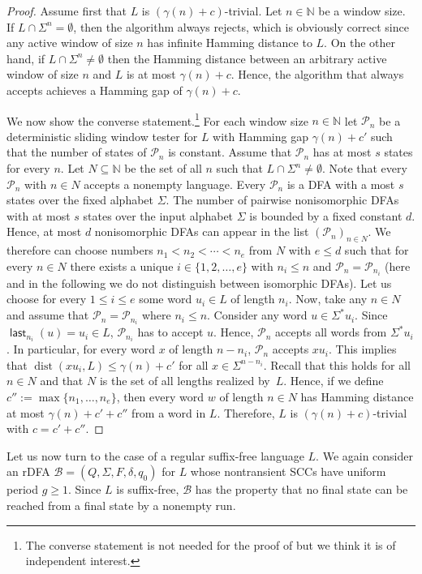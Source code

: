 \documentclass{theoretics}
\newcommand{\N}{\mathbb{N}}
\newcommand{\B}{\mathcal{B}}
\renewcommand{\P}{\mathcal{P}}
\DeclareMathOperator{\last}{\mathsf{last}}
\DeclareMathOperator{\dist}{dist}
\renewcommand{\geq}{\geqslant}
\renewcommand{\leq}{\leqslant}
\renewcommand{\ge}{\geq}
\renewcommand{\le}{\leq}
\begin{document}
\begin{proof}
Assume first that $L$ is $(\gamma(n)+c)$-trivial. Let $n \in \N$ be a window size.
If $L\cap \Sigma^n=\emptyset$, then the algorithm always rejects,
which is obviously correct since any active window of size $n$ has infinite Hamming distance to $L$. 
On the other hand, if $L\cap \Sigma^n \neq \emptyset$ then the Hamming distance between an arbitrary active window
of size $n$ and $L$ is at most $\gamma(n)+c$. Hence, the algorithm that always accepts achieves
a Hamming gap of $\gamma(n)+c$.

We now show the converse statement.\footnote{The converse statement is not needed for the proof of  
but we think it is of independent interest.}
For each window size $n \in \N$ let $\P_n$ be a deterministic sliding window tester for $L$
with Hamming gap $\gamma(n)+c'$ such that the number of states of $\P_n$ is constant.
Assume that $\P_n$ has at most $s$ states for every $n$.
Let $N \subseteq \N$ be the set of all $n$ such that $L \cap \Sigma^n \neq \emptyset$.
Note that every $\P_n$ with $n \in N$ accepts a nonempty language.
Every $\P_n$ is a DFA with a most $s$ states over the fixed alphabet $\Sigma$.
The number of pairwise nonisomorphic DFAs with at most $s$ states
over the input alphabet $\Sigma$ is bounded by a fixed constant $d$.
Hence, at most $d$ nonisomorphic DFAs can appear in the list $(\P_n)_{n \in N}$.
We therefore can choose 
numbers $n_1 < n_2 < \cdots < n_e$ from $N$ with $e \leq d$ such that
for every $n \in N$ there exists a unique $i \in \{1,2,\ldots,e\}$ with $n _i \le n$ and $\P_n = \P_{n_i}$
(here and in the following we do not distinguish between isomorphic DFAs).
Let us choose for every $1 \le i \le e$ some word $u_i \in L$ of length $n_i$.
Now, take any $n \in N$ and assume that $\P_n = \P_{n_i}$ where $n_i \leq n$.
Consider any word $u \in \Sigma^* u_i$.
Since $\last_{n_i}(u) = u_i \in L$, $\P_{n_i}$ has to accept $u$.
Hence, $\P_n$ accepts all words from $\Sigma^* u_i$.
In particular, for every word $x$ of length $n-n_i$, $\P_n$ accepts $xu_i$.
This implies that $\dist(x u_i,L) \leq \gamma(n)+c'$ for all $x \in \Sigma^{n-n_i}$.
Recall that this holds for all $n \in N$ and that $N$ is the set of all lengths realized by~$L$.
Hence, if we define $c'' := \max\{n_1, \ldots, n_e\}$,
then every word $w$ of length $n \in N$ has Hamming distance at most $\gamma(n)+c'+c''$ from a word in $L$.
Therefore, $L$ is $(\gamma(n)+c)$-trivial with $c=c'+c''$. 
\end{proof}
Let us now turn to the case of a regular suffix-free language $L$.
We again consider an rDFA $\B = (Q,\Sigma,F,\delta,q_0)$
for $L$ whose nontransient SCCs have uniform period $g \ge 1$.
Since $L$ is suffix-free, $\B$ has the property that no final state can be reached from a
final state by a nonempty run.
\end{document}
